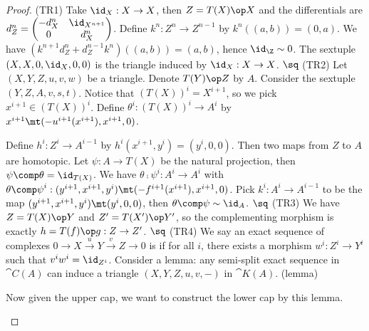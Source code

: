 \begin{proof}
    (TR1) Take ${\id}_{X}:X\to X$, then $Z=T(X)\op X$ and the differentials are ${d}_{Z}^{n}=\begin{pmatrix}
        -{d}_{X}^{n} & {\id}_{{X}^{n+1}} \\
        0 & {d}_{X}^{n}
    \end{pmatrix}$. Define ${k}^{n}:{Z}^{n}\to{Z}^{n-1}$ by ${k}^{n}((a,b))=(0,a)$. We have $({k}^{n+1}{d}_{Z}^{n}+{d}_{Z}^{n-1}{k}^{n})((a,b))=(a,b)$, hence ${\id}_{\Z}\sim 0$. The sextuple $(X,X,0,{\id}_{X},0,0)$ is the triangle induced by ${\id}_{X}:X\to X$. $\sq$ (TR2) Let $(X,Y,Z,u,v,w)$ be a triangle. Denote $T(Y)\op Z$ by $A$. Consider the sextuple $(Y,Z,A,v,s,t)$. Notice that ${(T(X))}^{i}={X}^{i+1}$, so we pick ${x}^{i+1}\in{(T(X))}^{i}$. Define ${\theta}^{i}:{(T(X))}^{i}\to{A}^{i}$ by ${x}^{i+1}\mt(-{u}^{i+1}({x}^{i+1}),{x}^{i+1},0)$.
    \begin{center}
    \end{center}
    Define ${h}^{i}:{Z}^{i}\to{A}^{i-1}$ by ${h}^{i}({x}^{i+1},{y}^{i})=({y}^{i},0,0)$. Then two maps from $Z$ to $A$ are homotopic. Let $\psi:A\to T(X)$ be the natural projection, then $\psi\comp\theta={\id}_{T(X)}$. We have ${\theta\comp\psi}^{i}:{A}^{i}\to{A}^{i}$ with ${\theta\comp\psi}^{i}:({y}^{i+1},{x}^{i+1},{y}^{i})\mt(-{f}^{i+1}({x}^{i+1}),{x}^{i+1},0)$. Pick ${k}^{i}:{A}^{i}\to{A}^{i-1}$ to be the map $({y}^{i+1},{x}^{i+1},{y}^{i})\mt({y}^{i},0,0)$, then $\theta\comp\psi\sim{\id}_{A}$. $\sq$ (TR3) We have $Z=T(X)\op Y$ and $Z'=T(X')\op Y'$, so the complementing morphism is exactly $h=T(f)\op g:Z\to Z'$. $\sq$ (TR4) We say an exact sequence of complexes $0\to X\xrightarrow{u}Y\xrightarrow{v}Z\to 0$ is  if for all $i$, there exists a morphism ${w}^{i}:{Z}^{i}\to{Y}^{i}$ such that ${v}^{i}{w}^{i}={\id}_{{Z}^{i}}$. Consider a lemma: any semi-split exact sequence in $\cat{C(A)}$ can induce a triangle $(X,Y,Z,u,v,-)$ in $\cat{K(A)}$. (lemma) 

    Now given the upper cap, we want to construct the lower cap by this lemma.
    \begin{center}
        
    \end{center}
\end{proof}
